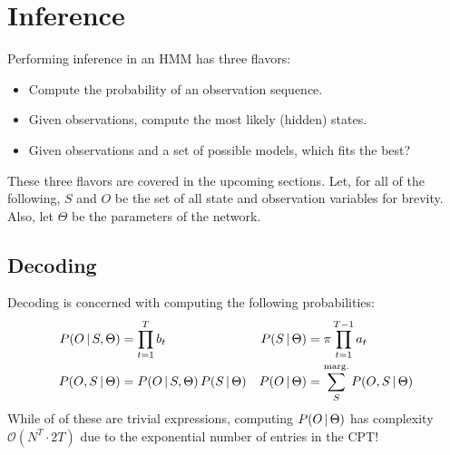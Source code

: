 	\section{Inference}
		Performing inference in an HMM has three flavors:
		\begin{itemize}
			\item {}             Compute the probability of an observation sequence.
			\item {}  Given observations, compute the most likely (hidden) states.
			\item {} Given observations and a set of possible models, which fits the best?
		\end{itemize}
		These three flavors are covered in the upcoming sections. Let, for all of the following, \(S\) and \(O\) be the set of all state and observation variables for brevity. Also, let \(\Theta\) be the parameters of the network.

		\subsection{Decoding}
			Decoding is concerned with computing the following probabilities:
			\begin{align}
				P(O \,\vert\, S, \Theta) &= \prod_{t = 1}^{T} b_t &
				   P(S \,\vert\, \Theta) &= \pi \prod_{t = 1}^{T - 1} a_t \\
				P(O, S \,\vert\, \Theta) &= P(O \,\vert\, S, \Theta) \, P(S \,\vert\, \Theta) &
				   P(O \,\vert\, \Theta) &= \sum_{S}^{\operatorname{marg.}} P(O, S \,\vert\, \Theta)
			\end{align}
			While of of these are trivial expressions, computing \( P(O \,\vert\, \Theta) \) has complexity \( \mathcal{O}(N^T \cdot 2T) \) due to the exponential number of entries in the CPT!

